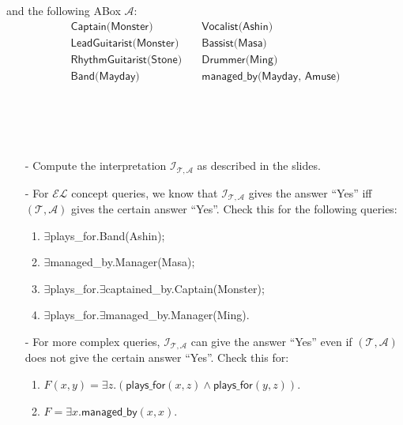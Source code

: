 \documentclass{article}
\begin{document}
    and the following ABox $\mathcal{A}$:
    \begin{align*}
        \textsf{Captain(Monster)}\quad &\textsf{Vocalist(Ashin)}\\
        \textsf{LeadGuitarist(Monster)}\quad & \textsf{Bassist(Masa)}\\
        \textsf{RhythmGuitarist(Stone)}\quad & \textsf{Drummer(Ming)}\\
        \textsf{Band(Mayday)}\quad & \textsf{managed\_by(Mayday, Amuse)}
    \end{align*}~\\~\\~\\~\\
    \begin{itemize}
    \item[-] Compute the interpretation $\mathcal{I}_{\mathcal{T},\mathcal{A}}$ as described in the slides.
    \item[-] For $\mathcal{EL}$ concept queries, we know that $\mathcal{I}_{\mathcal{T},\mathcal{A}}$ gives the answer ``Yes'' iff $(\mathcal{T}, \mathcal{A})$ gives the certain answer ``Yes''. Check this for the following queries:
    \begin{enumerate}
    \item \textsf{$\exists$plays\_for.Band(Ashin);}
    \item \textsf{$\exists$managed\_by.Manager(Masa);}
    \item \textsf{$\exists$plays\_for.$\exists$captained\_by.Captain(Monster);}
    \item \textsf{$\exists$plays\_for.$\exists$managed\_by.Manager(Ming).}
    \end{enumerate}
    \item[-] For more complex queries, $\mathcal{I}_{\mathcal{T},\mathcal{A}}$ can give the answer ``Yes'' even if $(\mathcal{T}, \mathcal{A})$ does not give the certain answer ``Yes''. Check this for:
    \begin{enumerate}
    \item $F(x,y)=\exists z.(\textsf{plays\_for}(x,z)\wedge\textsf{plays\_for}(y,z))$.
    \item $F=\exists x.\textsf{managed\_by}(x,x)$.
    \end{enumerate}
    \end{itemize}
\end{document}
